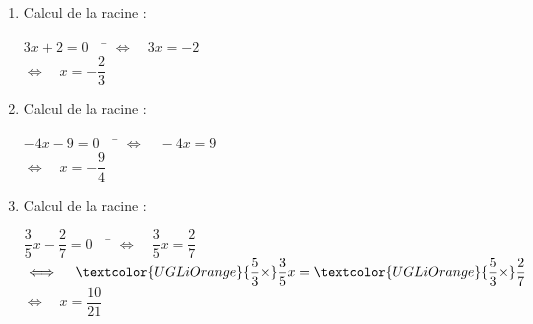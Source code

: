 \documentclass[a4paper,11pt,exos]{nsi} %
\begin{document}
\begin{enumerate}
    \item \begin{multicols}{2}
        Calcul de la racine :
    \begin{tabbing}
        $3x+2=0\quad$   \=  $\iff\quad 3x=-2$\\
        \>  $\iff \quad x=-\dfrac{2}{3}$
    \end{tabbing}
    \end{multicols}
    
    \item \begin{multicols}{2}
        Calcul de la racine :
        \begin{tabbing}
            $-4x-9=0\quad$  \=  $\iff\quad -4x=9$\\
            \>  $\iff\quad x=-\dfrac{9}{4}$
        \end{tabbing}       
    \end{multicols}

    \item Calcul de la racine :
    \begin{multicols}{2}
        \begin{tabbing}
            $\dfrac{3}{5}x-\dfrac{2}{7}=0\quad$  \=  $\iff\quad \dfrac{3}{5}x=\dfrac{2}{7}$\\[.5em]
            \>  $\iff\quad \textcolor{UGLiOrange}{\dfrac{5}{3}\times}\dfrac{3}{5}x=\textcolor{UGLiOrange}{\dfrac{5}{3}\times}\dfrac{2}{7}$\\[.5em]
            \>  $\iff\quad x= \dfrac{10}{21}$
        \end{tabbing}       
    \end{multicols}


\end{enumerate}
\end{document}
